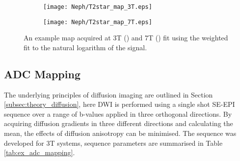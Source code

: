 \begin{figure}[H]
	\centering
	\begin{subfigure}[c]{0.47\textwidth}
		\centering
		\texttt{[image: Neph/T2star\_map\_3T.eps]}
		\caption{}
		\label{fig:ex_t2star_map_3t}
	\end{subfigure}
	\hfill
	\begin{subfigure}[c]{0.47\textwidth}
		\centering
		\texttt{[image: Neph/T2star\_map\_7T.eps]}
		\caption{}
		\label{fig:ex_t2star_map_7t}
	\end{subfigure}
	\caption{An example \ttwostar map acquired at 3T () and 7T () fit using the weighted fit to the natural logarithm of the signal.}
	\label{fig:ex_t2star_maps}
\end{figure}

\subsection{\acl*{ADC} Mapping}
\label{subsec:ex_adc}

The underlying principles of diffusion imaging are outlined in Section \ref{subsec:theory_diffusion}, here \ac{DWI} is performed using a single shot \ac{SE}-\ac{EPI} sequence over a range of b-values applied in three orthogonal directions. By acquiring diffusion gradients in three different directions and calculating the mean, the effects of diffusion anisotropy can be minimised. The sequence was developed for 3T systems, sequence parameters are summarised in Table \ref{tab:ex_adc_mapping}. 


